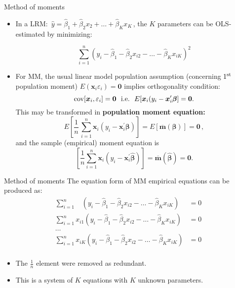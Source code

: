 \documentclass{beamer}
\begin{document}
\begin{frame}{Method of moments}
\footnotesize
\begin{itemize}
\item In a LRM: $\, \hat{y} = \hat{\beta}_1 + \hat{\beta}_2 x_{2} + \dots + \hat{\beta}_K x_{K} \,$, the $K$ parameters can be OLS-estimated by minimizing:

\begin{equation*}
\sum_{i=1}^n \left( y_i - \hat{\beta}_1 - \hat{\beta}_2 x_{i2} - \dots - \hat{\beta}_K x_{iK} \right)^2
\end{equation*}
\item For MM, the usual linear model population assumption (concerning $1^{\textnormal{st}}$ population moment) $E(\bm{x}_i \varepsilon_i)=\bm{0}$ implies orthogonality condition: $$\textnormal{cov}[\bm{x}_i, \varepsilon_i] = \bm{0} \textnormal{~~i.e.~~}E[\bm{x}_i(y_i-\bm{x}_i^{\prime}\bm{\beta}]=\bm{0}.$$ 
This may be transformed in \textbf{population moment equation:}
$$
E \left[ \frac{1}{n} \, \sum_{i=1}^n \bm{x}_i (y_i - \bm{x}_i^{\prime}\bm{\beta}) \right] 
= E \left[ \overline{\bm{m}}(\bm{\beta}) \right] = \bm{0}\,,
$$
and the sample (empirical) moment equation is
$$
\left[ \frac{1}{n} \sum_{i=1}^n \bm{x}_i (y_i - \bm{x}_i^{\prime}\hat{\bm{\beta}}) \right]
= \overline{\bm{m}}(\hat{\bm{\beta}}) = \bm{0}.
$$
\end{itemize}
\end{frame}
\begin{frame}{Method of moments}
The equation form of MM empirical equations can be produced as:
\medskip
\footnotesize
\begin{equation*}
\begin{aligned}
\sum_{i=1}^n ~~~~\left( y_i - \hat{\beta}_1 - \hat{\beta}_2 x_{i2} - \dots - \hat{\beta}_K x_{iK} \right) &= 0\\
\sum_{i=1}^n  x_{i1} \left( y_i - \hat{\beta}_1 - \hat{\beta}_2 x_{i2} - \dots - \hat{\beta}_K x_{iK} \right) &= 0\\
\dots &\\
\sum_{i=1}^n x_{iK} \left( y_i - \hat{\beta}_1 - \hat{\beta}_2 x_{i2} - \dots - \hat{\beta}_K x_{iK} \right) &= 0\\
\end{aligned}
\end{equation*}
\medskip
\begin{itemize}
    \item The $\frac{1}{n}$ element were removed as redundant.
    \item This is a system of $K$ equations with $K$ unknown parameters.
\end{itemize}
\end{frame}
\end{document}
